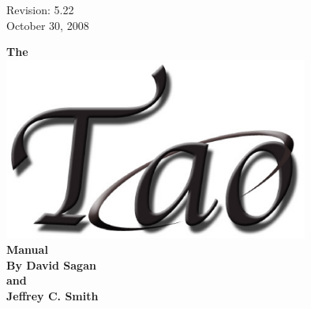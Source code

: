 \thispagestyle{empty}

\begin{flushright}
\large
  Revision: 5.22 \\
  October 30, 2008 \\
\end{flushright}

\vfill

{
\begin{center}
{\Huge \sf\bf The} \\
\vskip 0.1in
\includegraphics[width=10cm]{tao.eps} \\
\vskip 0.1in
{\Huge \sf\bf Manual} \\
\vskip 0.4in
{\Large \sf\bf By David Sagan \\ and \\ Jeffrey C. Smith} \\
\end{center}
}

\vfill
\break
